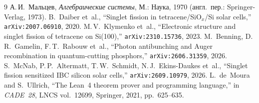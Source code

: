 \documentclass[11pt,a4paper]{article}
\theoremstyle{plain}
\theoremstyle{definition}
\begin{document}
\begin{thebibliography}{9}
А.\,И.~Мальцев, \emph{Алгебраические системы}, М.: Наука, 1970 (англ.\ пер.: Springer-Verlag, 1973).
B.~Daiber et~al., ``Singlet fission in tetracene/SiO$_x$/Si solar cells,'' \texttt{arXiv:2007.06910}, 2020.
M.\,V.~Klymenko et~al., ``Electronic structure and singlet fission of tetracene on Si(100),'' \texttt{arXiv:2310.15736}, 2023.
M.~Benning, D.\,R.~Gamelin, F.\,T.~Rabouw et~al., ``Photon antibunching and Auger recombination in quantum-cutting phosphors,'' \texttt{arXiv:2606.31359}, 2026.
S.~McNab, P.\,P.~Altermatt, T.\,W.~Schmidt, N.\,J.~Ekins-Daukes et~al., ``Singlet fission sensitized IBC silicon solar cells,'' \texttt{arXiv:2609.10979}, 2026.
L.~de~Moura and S.~Ullrich, ``The Lean~4 theorem prover and programming language,'' in \emph{CADE~28}, LNCS vol.~12699, Springer, 2021, pp.~625--635.
\end{thebibliography}
\end{document}
